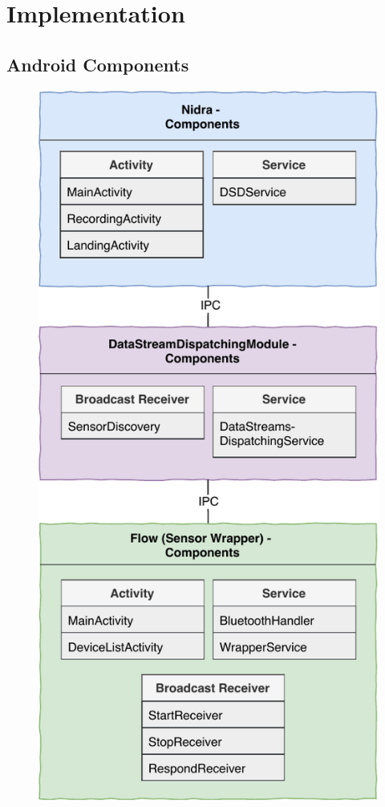 \chapter{Implementation}

%

\section{Android Components}

\begin{figure}
    \centering
    \includegraphics[scale=0.95]{images/Android_Components.pdf}

\end{figure}
